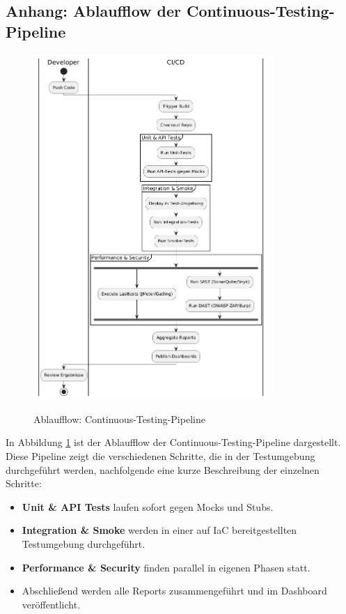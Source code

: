 \subsection{Anhang: Ablaufflow der Continuous-Testing-Pipeline}
\begin{figure}[h!]
\centering
\caption{Ablaufflow: Continuous-Testing-Pipeline}
    \includegraphics[width=0.8\textwidth]{fig/ablauf_pipeline.png}
    \label{fig:flow}
\end{figure}

In Abbildung \ref{fig:flow} ist der Ablaufflow der Continuous-Testing-Pipeline dargestellt.
Diese Pipeline zeigt die verschiedenen Schritte, die in der Testumgebung durchgeführt werden,
nachfolgende eine kurze Beschreibung der einzelnen Schritte:

\begin{itemize}
    \item \textbf{Unit \& API Tests} laufen sofort gegen Mocks und Stubs.
    \item \textbf{Integration \& Smoke} werden in einer auf IaC bereitgestellten Testumgebung durchgeführt.
    \item \textbf{Performance \& Security} finden parallel in eigenen Phasen statt.
    \item Abschließend werden alle Reports zusammengeführt und im Dashboard veröffentlicht.
\end{itemize}

